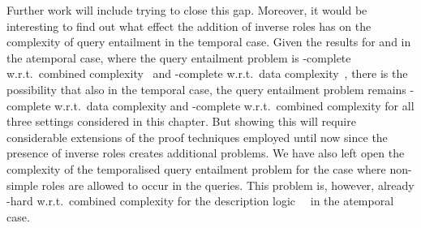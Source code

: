 Further work will include trying to close this gap.  Moreover, it would be
interesting to find out what effect the addition of inverse roles has on the
complexity of query entailment in the temporal case.  Given the results for
\ALCI and \SHIQ in the atemporal case, where the query entailment problem is
\TwoExpTime-complete w.r.t.\ combined complexity~\cite{Lut-IJCAR08} and
\coNP-complete w.r.t.\ data complexity~\cite{OrCE-AAAI06}, there is the
possibility that also in the temporal case, the query entailment problem remains
\coNP-complete w.r.t.\ data complexity and \TwoExpTime-complete w.r.t.\ combined
complexity for all three settings considered in this chapter.  But showing this
will require considerable extensions of the proof techniques employed until now
since the presence of inverse roles creates additional problems.
%
We have also left open the complexity of the temporalised query entailment
problem for the case where non-simple roles are allowed to occur in the queries.
This problem is, however, already \TwoExpTime-hard w.r.t.\ combined complexity
for the description logic~\SH~\cite{ELO+-IJCAI09} in the atemporal case.
